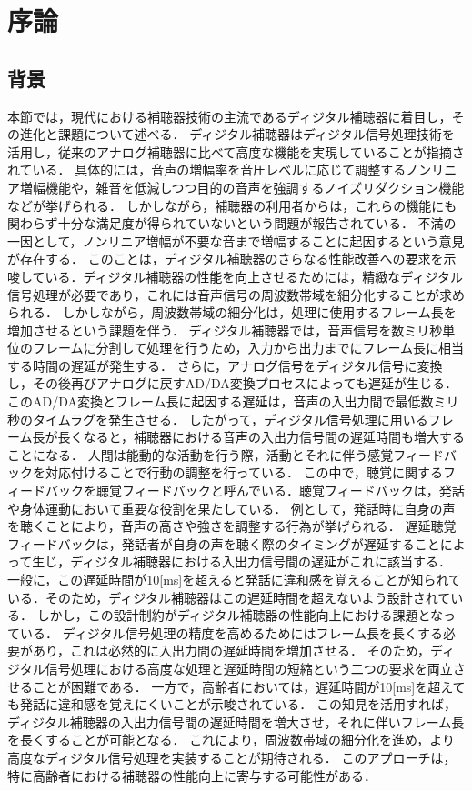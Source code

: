 \chapter{序論}
\section{背景}
本節では，現代における補聴器技術の主流であるディジタル補聴器に着目し，その進化と課題について述べる．
ディジタル補聴器はディジタル信号処理技術を活用し，従来のアナログ補聴器に比べて高度な機能を実現していることが指摘されている\cite{EaringAids_20}\cite{EaringAids-2}．
具体的には，音声の増幅率を音圧レベルに応じて調整するノンリニア増幅機能や，雑音を低減しつつ目的の音声を強調するノイズリダクション機能などが挙げられる．
しかしながら，補聴器の利用者からは，これらの機能にも関わらず十分な満足度が得られていないという問題が報告されている\cite{Manzokudo}．
不満の一因として，ノンリニア増幅が不要な音まで増幅することに起因するという意見が存在する．
このことは，ディジタル補聴器のさらなる性能改善への要求を示唆している．ディジタル補聴器の性能を向上させるためには，精緻なディジタル信号処理が必要であり，これには音声信号の周波数帯域を細分化することが求められる．
しかしながら，周波数帯域の細分化は，処理に使用するフレーム長を増加させるという課題を伴う．
ディジタル補聴器では，音声信号を数ミリ秒単位のフレームに分割して処理を行うため，入力から出力までにフレーム長に相当する時間の遅延が発生する．
さらに，アナログ信号をディジタル信号に変換し，その後再びアナログに戻すAD/DA変換プロセスによっても遅延が生じる．
このAD/DA変換とフレーム長に起因する遅延は，音声の入出力間で最低数ミリ秒のタイムラグを発生させる．
したがって，ディジタル信号処理に用いるフレーム長が長くなると，補聴器における音声の入出力信号間の遅延時間も増大することになる．
人間は能動的な活動を行う際，活動とそれに伴う感覚フィードバックを対応付けることで行動の調整を行っている．
この中で，聴覚に関するフィードバックを聴覚フィードバックと呼んでいる\cite{DAF}．聴覚フィードバックは，発話や身体運動において重要な役割を果たしている．
例として，発話時に自身の声を聴くことにより，音声の高さや強さを調整する行為が挙げられる．
遅延聴覚フィードバックは，発話者が自身の声を聴く際のタイミングが遅延することによって生じ，ディジタル補聴器における入出力信号間の遅延がこれに該当する．
一般に，この遅延時間が10[ms]を超えると発話に違和感を覚えることが知られている\cite{DelayTime-ninnchi}．そのため，ディジタル補聴器はこの遅延時間を超えないよう設計されている\cite{EaringAids_20}．
しかし，この設計制約がディジタル補聴器の性能向上における課題となっている．
ディジタル信号処理の精度を高めるためにはフレーム長を長くする必要があり，これは必然的に入出力間の遅延時間を増加させる．
そのため，ディジタル信号処理における高度な処理と遅延時間の短縮という二つの要求を両立させることが困難である．
一方で，高齢者においては，遅延時間が10[ms]を超えても発話に違和感を覚えにくいことが示唆されている\cite{shigematu-toukyoushibu}．
この知見を活用すれば，ディジタル補聴器の入出力信号間の遅延時間を増大させ，それに伴いフレーム長を長くすることが可能となる．
これにより，周波数帯域の細分化を進め，より高度なディジタル信号処理を実装することが期待される．
このアプローチは，特に高齢者における補聴器の性能向上に寄与する可能性がある．
